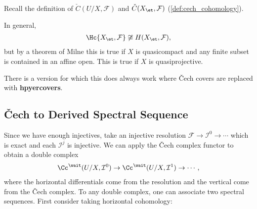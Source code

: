 Recall the definition of \(\check{C}(U/X, \mathcal{F})\) and
\(\check{C}(X_\et, \mathcal{F})\) (\cref{def:cech_cohomology}).

\begin{warnings}

In general,
\begin{align*}
\Hc{X_\et, \mathcal{F}} \not\cong H(X_\et, \mathcal{F})
,\end{align*} but by a theorem of Milne this is true if \(X\) is
quasicompact and any finite subset is contained in an affine open. This
is true if \(X\) is quasiprojective.

\end{warnings}

\begin{remark}

There is a version for which this does always work where Čech covers are
replaced with \textbf{hpyercovers}.

\end{remark}

\hypertarget{ux10dech-to-derived-spectral-sequence}{%
\subsection{Čech to Derived Spectral
Sequence}\label{ux10dech-to-derived-spectral-sequence}}

Since we have enough injectives, take an injective resolution
\(\mathcal{F}\to \mathcal{I}^0 \to \cdots\) which is exact and each
\(\mathcal{I}^j\) is injective. We can apply the Čech complex functor to
obtain a double complex
\begin{align*}
\Cc^\wait(U/X, \mathcal{I}^0) \to \Cc^\wait(U/X, \mathcal{I}^1) \to \cdots
,\end{align*} where the horizontal differentials come from the
resolution and the vertical come from the Čech complex. To any double
complex, one can associate two spectral sequences. First consider taking
horizontal cohomology:

\begin{center}
\end{center}

